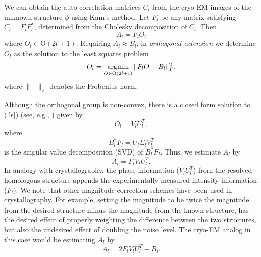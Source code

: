 \documentclass{article}
\newcommand{\argmin}{\operatornamewithlimits{argmin}}
\begin{document}
We can obtain the auto-correlation matrices $C_l$ from the cryo-EM images of the
unknown structure $\phi$ using Kam's method.
Let $F_l$ be any matrix satisfying $C_l= F_l F_l^*$, determined from the
Cholesky decomposition of $C_l$. Then 
\begin{equation}
A_l = F_l O_l
\end{equation}
where $O_l \in \text{O}(2l+1)$. Requiring $A_l \approx B_l$, in {\em orthogonal extension} we determine $O_l$ as the solution to the
least squares problem
\begin{equation}\label{ls}
O_l=\argmin_{O \in \text{O}(2l+1)}  \|F_l O - B_l\|_F^2,
\end{equation}
where $\|\cdot\|_F$ denotes the Frobenius norm. 

Although the orthogonal group is non-convex, there is a closed form solution to (\ref{ls}) (see, e.g., \cite{keller}) given by
\begin{equation}
O_l= V_l U_l^T,
\end{equation}
where 
\begin{equation}
B_l^* F_l = U_l \Sigma_l V_l^T
\end{equation}
is the singular value decomposition (SVD) of $B_l^* F_l$. Thus, we estimate $A_l$ by 
\begin{equation}
A_l = F_l V_l U_l^T.
\end{equation} 
In analogy with crystallography, the phase
information ($V_l U_l^T$) from the resolved homologous
structure appends the experimentally measured intensity information ($F_l$). We note that other magnitude correction schemes have been used in crystallography. For example, setting the magnitude to be twice the magnitude from the desired structure minus the magnitude from the known structure, has the desired effect of properly weighting the difference between the two structures, but also the undesired effect of doubling the noise level. The cryo-EM analog in this case would be estimating $A_l$ by 
\begin{equation}
A_l = 2F_l V_l U_l^T - B_l.
\end{equation}
\end{document}
